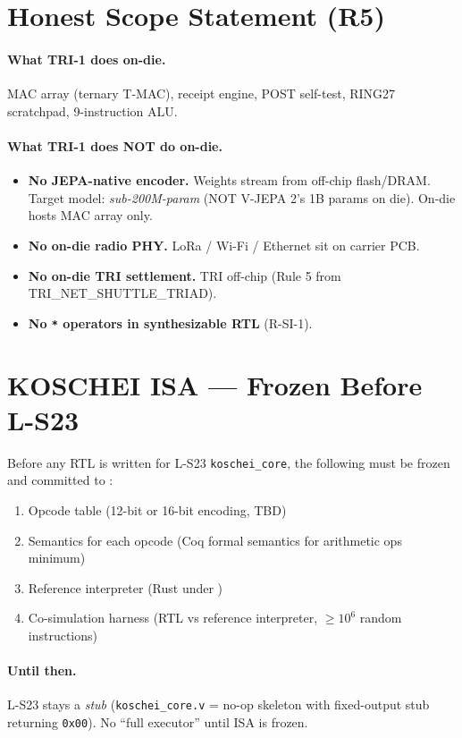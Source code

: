 \section{Honest Scope Statement (R5)}
\label{sec:36:scope}

\paragraph{What TRI-1 does on-die.}
MAC array (ternary T-MAC), receipt engine, POST self-test, RING27 scratchpad,
9-instruction ALU.

\paragraph{What TRI-1 does NOT do on-die.}
\begin{itemize}
  \item \textbf{No JEPA-native encoder.} Weights stream from off-chip flash/DRAM.
        Target model: \emph{sub-200M-param} (NOT V-JEPA 2's 1B params on
        die). On-die hosts MAC array only.
  \item \textbf{No on-die radio PHY.} LoRa / Wi-Fi / Ethernet sit on carrier PCB.
  \item \textbf{No on-die TRI settlement.} TRI off-chip (Rule 5 from
        TRI\_NET\_SHUTTLE\_TRIAD).
  \item \textbf{No \texttt{*} operators in synthesizable RTL} (R-SI-1).
\end{itemize}

\section{KOSCHEI ISA --- Frozen Before L-S23}
\label{sec:36:koschei}

Before any RTL is written for L-S23 \texttt{koschei\_core}, the following
must be frozen and committed to :
\begin{enumerate}
  \item Opcode table (12-bit or 16-bit encoding, TBD)
  \item Semantics for each opcode (Coq formal semantics for arithmetic ops minimum)
  \item Reference interpreter (Rust under )
  \item Co-simulation harness (RTL vs reference interpreter, $\geq 10^6$ random instructions)
\end{enumerate}

\paragraph{Until then.}
L-S23 stays a \emph{stub} (\texttt{koschei\_core.v} = no-op skeleton with
fixed-output stub returning \texttt{0x00}). No \enquote{full executor} until
ISA is frozen.

